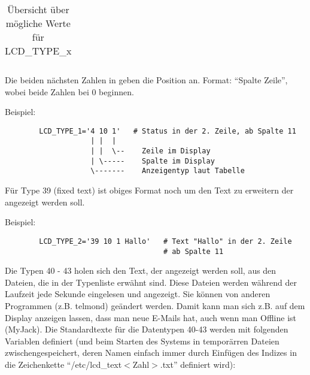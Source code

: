 \begin{description}
\begin{table}[htbp]
\begin{small}
\begin{center}
\begin{tabular}{rlr}
            \end{tabular}
            \caption{Übersicht über mögliche Werte für LCD\_TYPE\_x}
          \end{center}
          \end{small}
        \end{table}




        Die beiden nächsten Zahlen in  geben die Position an.
        Format: ``Spalte Zeile'', wobei beide Zahlen bei 0 beginnen.

      Beispiel:

\begin{example}
\begin{verbatim}
        LCD_TYPE_1='4 10 1'   # Status in der 2. Zeile, ab Spalte 11
                    | |  |
                    | |  \--    Zeile im Display 
                    | \-----    Spalte im Display
                    \-------    Anzeigentyp laut Tabelle
\end{verbatim}
\end{example}


        Für Type 39 (fixed text) ist obiges Format noch um den Text zu
        erweitern der angezeigt werden soll.

      Beispiel:

\begin{example}
\begin{verbatim}
        LCD_TYPE_2='39 10 1 Hallo'   # Text "Hallo" in der 2. Zeile 
                                     # ab Spalte 11
\end{verbatim}
\end{example}

      
      Die Typen 40 - 43 holen sich den Text, der angezeigt werden
      soll, aus den Dateien, die in der Typenliste erwähnt sind. Diese
      Dateien werden während der Laufzeit jede Sekunde eingelesen und
      angezeigt.  Sie können von anderen Programmen (z.B. telmond)
      geändert werden.  Damit kann man sich z.B. auf dem Display
      anzeigen lassen, dass man neue \mbox{E-Mails} hat, auch wenn man Offline
      ist (MyJack).  Die Standardtexte für die Datentypen 40-43 werden
      mit folgenden Variablen definiert (und beim Starten des Systems
      in temporärren Dateien zwischengespeichert, deren Namen einfach
      immer durch Einfügen des Indizes in die Zeichenkette
      ``/etc/lcd\_text$<$Zahl$>$.txt'' definiert wird):


\end{description}
